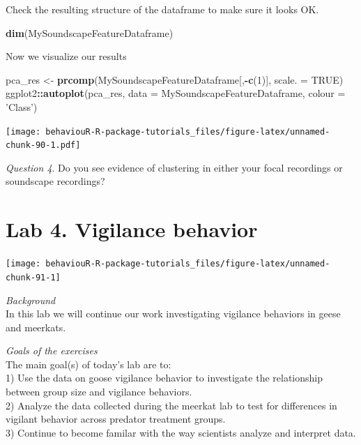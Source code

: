 \documentclass[]{book}
\newenvironment{Shaded}{\begin{snugshade}}{\end{snugshade}}
\newcommand{\DataTypeTok}[1]{\textcolor[rgb]{0.13,0.29,0.53}{#1}}
\newcommand{\DecValTok}[1]{\textcolor[rgb]{0.00,0.00,0.81}{#1}}
\newcommand{\KeywordTok}[1]{\textcolor[rgb]{0.13,0.29,0.53}{\textbf{#1}}}
\newcommand{\NormalTok}[1]{#1}
\newcommand{\OperatorTok}[1]{\textcolor[rgb]{0.81,0.36,0.00}{\textbf{#1}}}
\newcommand{\OtherTok}[1]{\textcolor[rgb]{0.56,0.35,0.01}{#1}}
\newcommand{\StringTok}[1]{\textcolor[rgb]{0.31,0.60,0.02}{#1}}
\begin{document}
Check the resulting structure of the dataframe to make sure it looks OK.

\begin{Shaded}
\begin{Highlighting}[]
\KeywordTok{dim}\NormalTok{(MySoundscapeFeatureDataframe)}
\end{Highlighting}
\end{Shaded}

Now we visualize our results

\begin{Shaded}
\begin{Highlighting}[]
\NormalTok{pca_res <-}\StringTok{ }\KeywordTok{prcomp}\NormalTok{(MySoundscapeFeatureDataframe[,}\OperatorTok{-}\KeywordTok{c}\NormalTok{(}\DecValTok{1}\NormalTok{)], }\DataTypeTok{scale. =} \OtherTok{TRUE}\NormalTok{)}
\NormalTok{ggplot2}\OperatorTok{::}\KeywordTok{autoplot}\NormalTok{(pca_res, }\DataTypeTok{data =}\NormalTok{ MySoundscapeFeatureDataframe, }
         \DataTypeTok{colour =} \StringTok{'Class'}\NormalTok{)}
\end{Highlighting}
\end{Shaded}

\texttt{[image: behaviouR-R-package-tutorials\_files/figure-latex/unnamed-chunk-90-1.pdf]}

\emph{Question 4}. Do you see evidence of clustering in either your focal recordings or soundscape recordings?

\hypertarget{lab-4.-vigilance-behavior}{%
\chapter{Lab 4. Vigilance behavior}\label{lab-4.-vigilance-behavior}}

\begin{center}\texttt{[image: behaviouR-R-package-tutorials\_files/figure-latex/unnamed-chunk-91-1]} \end{center}

\emph{Background}\\
In this lab we will continue our work investigating vigilance behaviors in geese and meerkats.

\emph{Goals of the exercises}\\
The main goal(s) of today's lab are to:\\
1) Use the data on goose vigilance behavior to investigate the relationship between group size and vigilance behaviors.\\
2) Analyze the data collected during the meerkat lab to test for differences in vigilant behavior across predator treatment groups.\\
3) Continue to become familar with the way scientists analyze and interpret data.
\end{document}
